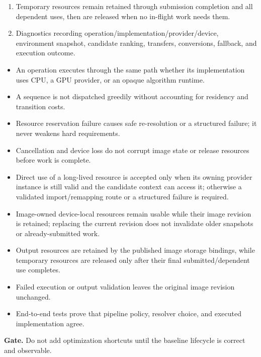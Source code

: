 \begin{enumerate}
  \item Temporary resources remain retained through submission completion and all dependent uses, then are released when no in-flight work needs them.
  \item Diagnostics recording operation/implementation/provider/device, environment snapshot, candidate ranking, transfers, conversions, fallback, and execution outcome.
\end{enumerate}

\exitcriteria
\begin{itemize}
  \item An operation executes through the same path whether its implementation uses CPU, a GPU provider, or an opaque algorithm runtime.
  \item A sequence is not dispatched greedily without accounting for residency and transition costs.
  \item Resource reservation failure causes safe re-resolution or a structured failure; it never weakens hard requirements.
  \item Cancellation and device loss do not corrupt image state or release resources before work is complete.
  \item Direct use of a long-lived resource is accepted only when its owning provider instance is still valid and the candidate context can access it; otherwise a validated import/remapping route or a structured failure is required.
  \item Image-owned device-local resources remain usable while their image revision is retained; replacing the current revision does not invalidate older snapshots or already-submitted work.
  \item Output resources are retained by the published image storage bindings, while temporary resources are released only after their final submitted/dependent use completes.
  \item Failed execution or output validation leaves the original image revision unchanged.
  \item End-to-end tests prove that pipeline policy, resolver choice, and executed implementation agree.
\end{itemize}

\textbf{Gate.} Do not add optimization shortcuts until the baseline lifecycle is correct and observable.